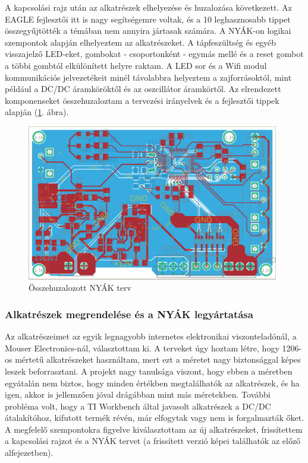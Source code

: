 \documentclass[../main.tex]{subfiles}
\begin{document}
            
            A kapcsolási rajz után az alkatrészek elhelyezése és huzalozása következett. Az EAGLE fejlesztői itt is nagy segítségemre voltak, és a 10 leghasznosabb tippet \cite{eagle_tips}
            összegyűjtötték a témában nem annyira jártasak számára.
            A NYÁK-on logikai szempontok alapján elhelyeztem az alkatrészeket. A tápfeszültség és egyéb visszajelző LED-eket, gombokat - csoportonként - egymás mellé és a reset gombot a többi gombtól elkülönített helyre raktam. A LED sor és a Wifi modul kommunikációs jelvezetékeit minél távolabbra helyeztem a zajforrásoktól, mint például a DC/DC áramköröktől és az oszcillátor áramkörtől. Az elrendezett komponenseket összehuzaloztam a tervezési irányelvek és a fejlesztői tippek alapján (\ref{fig:board_v02}. ábra). 
            
            \begin{figure}[h!]
                \centering
                    \includegraphics[width=11cm]{resources/pcb_res/board_v02.png}
                \caption{Összehuzalozott NYÁK terv}
                \label{fig:board_v02}
            \end{figure}
            
        \subsubsection{Alkatrészek megrendelése és a NYÁK legyártatása}
            
            Az alkatrészeimet az egyik legnagyobb internetes elektronikai viszonteladónál, a Mouser Electronics-nál, választottam ki. A terveket úgy hoztam létre, hogy 1206-os mértetű alkatrészeket használtam, mert ezt a méretet nagy biztonsággal képes leszek beforrasztani. A projekt nagy tanulsága viszont, hogy ebben a méretben egyátalán nem biztos, hogy minden értékben megtalálhatók az alkatrészek, és ha igen, akkor is jellemzően jóval drágábban mint más méretekben. További probléma volt, hogy a TI Workbench által javasolt alkatrészek a DC/DC átalakítóhoz, kifutott termék révén, már elfogytak vagy nem is forgalmazták őket. A megfelelő szempontokra figyelve kiválasztottam az új alkatrészeket, frissítettem a kapcsolási rajzot és a NYÁK tervet (a frissített verzió képei találhatók az előző alfejezetben). 
            
\end{document}
